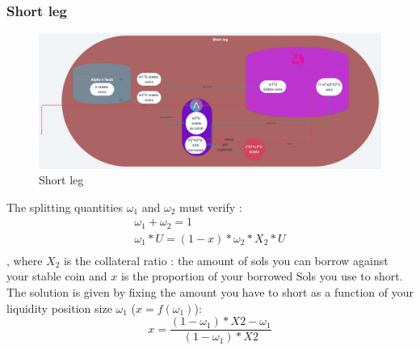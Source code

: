 \documentclass[conference]{IEEEtran}
\begin{document}
\subsubsection{Short leg}
\begin{figure}[h!]
    \centering
    \includegraphics[scale=0.035]{Plots/short_leg.png}
    \caption{Short leg}
    \label{fig:conc_liquidity}
\end{figure}
The splitting quantities $\omega_1$ and $\omega_2$ must verify : 
\begin{equation}
\begin{array}{ll}
\omega_1 + \omega_2 = 1\\
\omega_1*U = (1-x)*\omega_2*X_2*U\\    
\end{array}
\end{equation}
, where $X_2$ is the collateral ratio : the amount of sols you can borrow against your stable coin and $x$ is the proportion of your borrowed Sols you use to short.\\
The solution is given by fixing the amount you have to short as a function of your liquidity position size $\omega_1$ ($x=f(\omega_1)$):
\begin{equation}
x = \frac{(1-\omega_1)*X2-\omega_1}{(1-\omega_1)*X2}
\end{equation}
\end{document}
